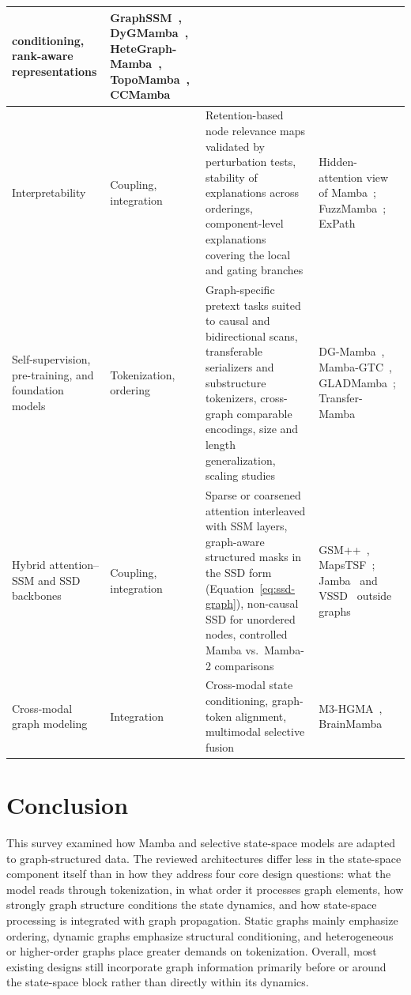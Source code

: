 \documentclass[acmsmall]{acmart}
\begin{document}
\begin{table}[!htbp]
{\begin{tabular}{>{\raggedright\arraybackslash}p{3.0cm} >{\raggedright\arraybackslash}p{2.4cm} >{\raggedright\arraybackslash}p{7.4cm} >{\raggedright\arraybackslash}p{4.6cm}}
conditioning, rank-aware representations &
GraphSSM~\cite{li2024state}, DyGMamba~\cite{ding2024dygmamba},
HeteGraph-Mamba~\cite{pan2024hetegraph},
TopoMamba~\cite{montagna2024topological}, CCMamba~\cite{chen2026ccmamba} \\
\midrule
Interpretability & Coupling, integration &
Retention-based node relevance maps validated by perturbation tests, stability
of explanations across orderings, component-level explanations covering the
local and gating branches &
Hidden-attention view of Mamba~\cite{ali2025hidden};
FuzzMamba~\cite{chen2026modeling}; ExPath~\cite{kotoge2026expath} \\
\midrule
Self-supervision, pre-training, and foundation models & Tokenization, ordering &
Graph-specific pretext tasks suited to causal and bidirectional scans,
transferable serializers and substructure tokenizers, cross-graph comparable
encodings, size and length generalization, scaling studies &
DG-Mamba~\cite{yuan2025dg}, Mamba-GTC~\cite{Meng2026Mamba-GTC},
GLADMamba~\cite{fu2025gladmamba}; Transfer-Mamba~\cite{cheng2025transfer} \\
\midrule
Hybrid attention--SSM and SSD backbones & Coupling, integration &
Sparse or coarsened attention interleaved with SSM layers, graph-aware
structured masks in the SSD form (Equation~\eqref{eq:ssd-graph}), non-causal
SSD for unordered nodes, controlled Mamba vs.\ Mamba-2 comparisons &
GSM++~\cite{behrouz2024best}, MapsTSF~\cite{wang2025mapstsf};
Jamba~\cite{lieber2024jamba} and VSSD~\cite{shi2025vssd} outside graphs \\
\midrule
Cross-modal graph modeling & Integration &
Cross-modal state conditioning, graph-token alignment, multimodal selective
fusion &
M3-HGMA~\cite{gubbala2026m3}, BrainMamba~\cite{behrouz2024brain} \\
\bottomrule
\end{tabular}}
\end{table}


 

\section{Conclusion}
\label{sec8}

 This survey examined how Mamba and selective state-space models are adapted to
graph-structured data. The reviewed architectures differ less in the
state-space component itself than in how they address four core design
questions: what the model reads through tokenization, in what order it processes
graph elements, how strongly graph structure conditions the state dynamics, and
how state-space processing is integrated with graph propagation. Static graphs
mainly emphasize ordering, dynamic graphs emphasize structural conditioning,
and heterogeneous or higher-order graphs place greater demands on tokenization.
Overall, most existing designs still incorporate graph information primarily
before or around the state-space block rather than directly within its dynamics.
\end{document}

